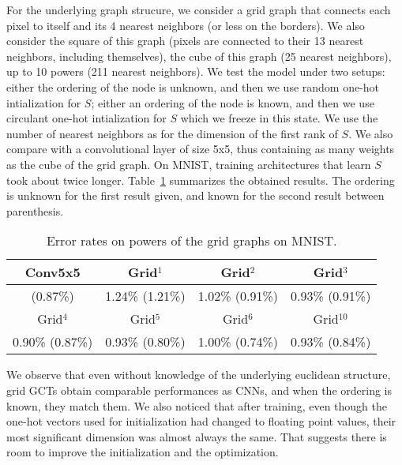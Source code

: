 For the underlying graph strucure, we consider a grid graph that connects each pixel to itself and its 4 nearest neighbors (or less on the borders). We also consider the square of this graph (pixels are connected to their 13 nearest neighbors, including themselves), the cube of this graph (25 nearest neighbors), up to 10 powers (211 nearest neighbors).
We test the model under two setups: either the ordering of the node is unknown, and then we use random one-hot intialization for $S$; either an ordering of the node is known, and then we use circulant one-hot intialization for $S$ which we freeze in this state. We use the number of nearest neighbors as for the dimension of the first rank of $S$.
We also compare with a convolutional layer of size 5x5, thus containing as many weights as the cube of the grid graph. On MNIST, training architectures that learn $S$ took about twice longer. Table~\ref{toy} summarizes the obtained results. The ordering is unknown for the first result given, and known for the second result between parenthesis.

\begin{table}[H]
  \caption{Error rates on powers of the grid graphs on MNIST.}
  \begin{center}
    \bgroup
    \def\arraystretch{1.5}%
    \begin{tabular}{|c|c|c|c|}
      \hline
      Conv5x5 & Grid$^1$ & Grid$^2$ & Grid$^3$\\
      \hline
      (0.87\%) & 1.24\% (1.21\%) & 1.02\% (0.91\%) & 0.93\% (0.91\%)\\
      \hline
      \hline
      Grid$^4$ & Grid$^5$ & Grid$^6$ & Grid$^{10}$\\
      \hline
      0.90\% (0.87\%) & 0.93\% (0.80\%) & 1.00\% (0.74\%) & 0.93\% (0.84\%)\\
      \hline
    \end{tabular}
    \egroup
  \end{center}
  \label{toy}
\end{table}

We observe that even without knowledge of the underlying euclidean structure, grid GCTs obtain comparable performances as CNNs, and when the ordering is known, they match them. We also noticed that after training, even though the one-hot vectors used for initialization had changed to floating point values, their most significant dimension was almost always the same. That suggests there is room to improve the initialization and the optimization.

